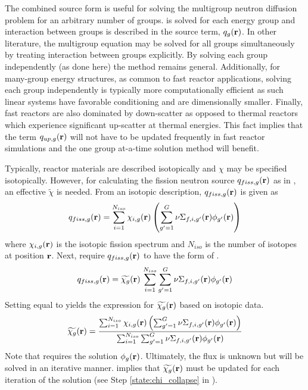   The combined source form is useful for solving the multigroup neutron
  diffusion problem for an arbitrary number of groups.
   is solved for each energy group and interaction
  between groups is described in the source term, $q_g(\mathbf{r})$. In other
  literature, the multigroup equation may be solved for all groups
  simultaneously by treating interaction between groups explicitly. By solving
  each group independently (as done here) the method remains general.
  Additionally, for many-group energy structures, as common to fast reactor
  applications, solving each group independently is typically more
  computationally efficient as such linear systems have favorable conditioning
  and are dimensionally smaller. Finally, fast reactors are also dominated by
  down-scatter as opposed to thermal reactors which experience significant
  up-scatter at thermal energies. This fact implies that the term $q_{up,g}(\mathbf{r})$ 
  will not have to be updated frequently in fast reactor simulations and the one
  group at-a-time solution method will benefit.

  Typically, reactor materials are described isotopically and $\chi$ may be
  specified isotopically. However, for calculating the fission neutron source
  $q_{fiss,g}(\mathbf{r})$ as in , an effective $\widetilde{\chi}$ is 
  needed. From an isotopic description, $q_{fiss,g}(\mathbf{r})$ is given as
  \begin{equation}
    \label{eq:isotopic_chi}
    q_{fiss,g}(\mathbf{r}) = \sum_{i=1}^{N_{iso}} \chi_{i,g}(\mathbf{r} )\left( \sum_{g'=1}^G
      \nu \Sigma_{f,i,g'}(\mathbf{r}) \phi_{g'}(\mathbf{r}) \right)
  \end{equation}
  where $\chi_{i,g}(\mathbf{r})$ is the isotopic fission spectrum and $N_{iso}$ is the 
  number of isotopes at position $\mathbf{r}$. Next, require $q_{fiss,g}(\mathbf{r})$ to have 
  the form of .
  \begin{equation}
    \label{eq:element_chi}
    q_{fiss,g}(\mathbf{r}) = \widetilde{\chi_g}(\mathbf{r}) \, 
      \sum_{i=1}^{N_{iso}} \sum_{g'=1}^G \nu \Sigma_{f,i,g'}(\mathbf{r}) \phi_{g'}(\mathbf{r})
  \end{equation}
  Setting  equal to  yields the
  expression for $\widetilde{\chi_g}(\mathbf{r})$ based on isotopic data.
  \begin{equation}
    \label{eq:chi_collapse}
    \widetilde{\chi_g}(\mathbf{r}) = \frac{\sum_{i=1}^{N_{iso}} \chi_{i,g}(\mathbf{r})
      \left( \sum_{g'=1}^G
      \nu \Sigma_{f,i,g'}(\mathbf{r}) \phi_{g'}(\mathbf{r}) \right)}
      {\sum_{i=1}^{N_{iso}} \sum_{g'=1}^G \nu \Sigma_{f,i,g'}(\mathbf{r}) \phi_{g'}(\mathbf{r})}
  \end{equation}
  Note that  requires the solution $\phi_g(\mathbf{r})$.
  Ultimately, the flux is unknown but will be solved in an iterative manner.
   implies that $\widetilde{\chi_g}(\mathbf{r})$ must be updated
  for each iteration of the solution (see Step \ref{state:chi_collapse} in
  ).
  
